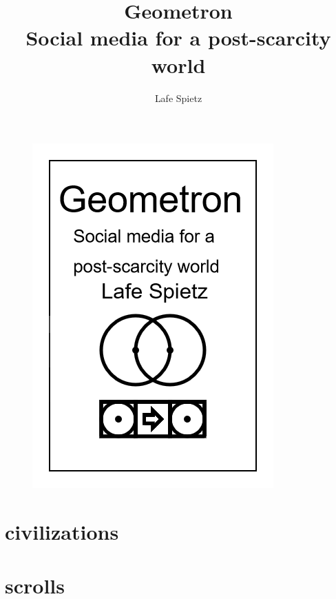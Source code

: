 \documentclass[ebook,12pt,openany,onesided]{memoir} %
\title{Geometron \\ Social media for a post-scarcity world}
\author{Lafe Spietz}
\begin{document}
\frontmatter
\begin{figure}[htbp]
\centering
\includegraphics{cover.png}
\end{figure}

\clearpage

\clearpage

\newpage
\thispagestyle{empty}
\mbox{}

\maketitle

\tableofcontents

\listoffigures 

%

\mainmatter

\chapter{civilizations}

\chapter{scrolls}





\end{document}
